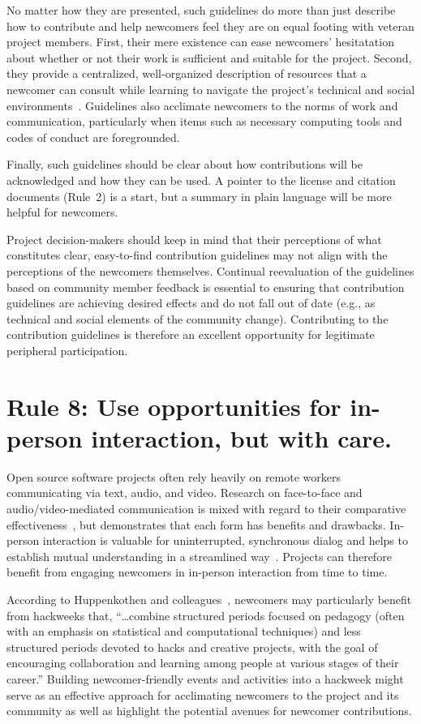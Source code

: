 \documentclass[10pt,letterpaper]{article}
\newcommand{\rulemajor}[1]{\section*{#1}}
\begin{document}
No matter how they are presented,
such guidelines do more than just describe how to contribute
and help newcomers feel they are on equal footing with veteran project members.
First,
their mere existence can ease newcomers' hesitatation
about whether or not their work is sufficient and suitable for the project.
Second,
they provide a centralized, well-organized description of resources
that a newcomer can consult while learning to navigate the project's technical and social environments~\cite{zanatta2017}.
Guidelines also acclimate newcomers to the norms of work and communication,
particularly when items such as necessary computing tools and codes of conduct are foregrounded.

Finally,
such guidelines should be clear about how contributions will be acknowledged
and how they can be used.
A pointer to the license and citation documents (Rule~2) is a start,
but a summary in plain language will be more helpful for newcomers.

Project decision-makers should keep in mind
that their perceptions of what constitutes clear, easy-to-find contribution guidelines
may not align with the perceptions of the newcomers themselves.
Continual reevaluation of the guidelines based on community member feedback is essential
to ensuring that contribution guidelines are achieving desired effects
and do not fall out of date (e.g., as technical and social elements of the community change).
Contributing to the contribution guidelines is therefore
an excellent opportunity for legitimate peripheral participation.

\rulemajor{Rule 8: Use opportunities for in-person interaction, but with care.}

Open source software projects often rely heavily on remote workers communicating via text, audio, and video.
Research on face-to-face and audio/video-mediated communication is mixed
with regard to their comparative effectiveness~\cite{doherty1997,gallupe1990,nardi2002},
but demonstrates that each form has benefits and drawbacks.
In-person interaction is valuable for uninterrupted, synchronous dialog
and helps to establish mutual understanding in a streamlined way~\cite{omalley1996}.
Projects can therefore benefit from engaging newcomers in in-person interaction from time to time.

According to Huppenkothen and colleagues~\cite{huppenkothen2018},
newcomers may particularly benefit from hackweeks that,
``{\ldots}combine structured periods focused on pedagogy
(often with an emphasis on statistical and computational techniques)
and less structured periods devoted to hacks and creative projects,
with the goal of encouraging collaboration and learning among people at various stages of their career.''
Building newcomer-friendly events and activities into a hackweek
might serve as an effective approach for acclimating newcomers to the project and its community
as well as highlight the potential avenues for newcomer contributions.
\end{document}
